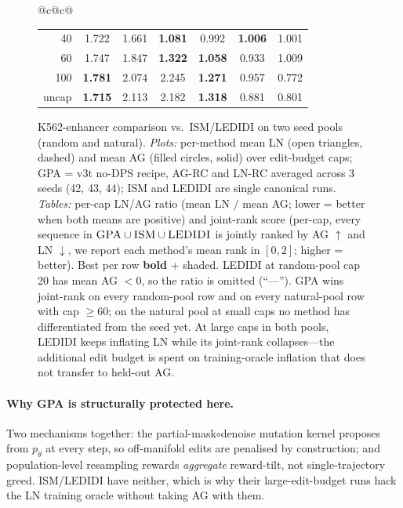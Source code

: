 \documentclass{article}
\theoremstyle{definition}
\theoremstyle{remark}
\newcommand{\gpa}{\textsc{GPA}\xspace}
\newcommand{\ism}{\textsc{ISM}\xspace}
\newcommand{\ledidi}{\textsc{LEDIDI}\xspace}
\begin{document}
\begin{figure}[t]
\begin{tabular}{@{}c@{\hspace{6pt}}c@{}}
\begin{tabular}{r ccc | ccc}
40    & 1.722 & 1.661 & \cellcolor{green!18}\textbf{1.081} & 0.992 & \cellcolor{green!18}\textbf{1.006} & 1.001 \\
60    & 1.747 & 1.847 & \cellcolor{green!18}\textbf{1.322} & \cellcolor{green!18}\textbf{1.058} & 0.933 & 1.009 \\
100   & \cellcolor{green!18}\textbf{1.781} & 2.074 & 2.245 & \cellcolor{green!18}\textbf{1.271} & 0.957 & 0.772 \\
uncap & \cellcolor{green!18}\textbf{1.715} & 2.113 & 2.182 & \cellcolor{green!18}\textbf{1.318} & 0.881 & 0.801 \\
\bottomrule
\end{tabular}
\end{tabular}
\caption{K562-enhancer comparison vs.\ \ism{}/\ledidi{} on two seed pools (random and natural). \emph{Plots:} per-method mean LN (open triangles, dashed) and mean AG (filled circles, solid) over edit-budget caps; \gpa{} = v3t no-DPS recipe, AG-RC and LN-RC averaged across 3 seeds (42, 43, 44); \ism{} and \ledidi{} are single canonical runs. \emph{Tables:} per-cap LN/AG ratio (mean LN $/$ mean AG; lower = better when both means are positive) and joint-rank score (per-cap, every sequence in $\gpa\cup\ism\cup\ledidi$ is jointly ranked by AG $\uparrow$ and LN $\downarrow$, we report each method's mean rank in $[0,2]$; higher = better). Best per row \textbf{bold} + shaded. \ledidi{} at random-pool cap 20 has mean AG $<\!0$, so the ratio is omitted (``---''). \gpa{} wins joint-rank on every random-pool row and on every natural-pool row with cap $\geq\!60$; on the natural pool at small caps no method has differentiated from the seed yet. At large caps in both pools, \ledidi{} keeps inflating LN while its joint-rank collapses---the additional edit budget is spent on training-oracle inflation that does not transfer to held-out AG.}
\label{fig:ism_ledidi}
\end{figure}

\paragraph{Why \gpa{} is structurally protected here.}
Two mechanisms together: the partial-mask$\circ$denoise mutation kernel proposes from $p_\theta$ at every step, so off-manifold edits are penalised by construction; and population-level resampling rewards \emph{aggregate} reward-tilt, not single-trajectory greed. \ism{}/\ledidi{} have neither, which is why their large-edit-budget runs hack the LN training oracle without taking AG with them.
\end{document}
